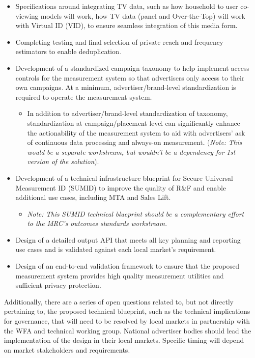 \documentclass[]{article}
\providecommand{\tightlist}{%
  \setlength{\itemsep}{0pt}\setlength{\parskip}{0pt}}
\begin{document}
\begin{itemize}
\tightlist
\item
  Specifications around integrating TV data, such as how household to user co-viewing models will work, how TV data (panel and Over-the-Top) will work with Virtual ID (VID), to ensure seamless integration of this media form.
\item
  Completing testing and final selection of private reach and frequency estimators to enable deduplication.
\item
  Development of a standardized campaign taxonomy to help implement access controls for the measurement system so that advertisers only access to their own campaigns. At a minimum, advertiser/brand-level standardization is required to operate the measurement system.

  \begin{itemize}
  \tightlist
  \item
    In addition to advertiser/brand-level standardization of taxonomy, standardization at campaign/placement level can significantly enhance the actionability of the measurement system to aid with advertisers' ask of continuous data processing and always-on measurement. (\emph{Note: This would be a separate workstream, but wouldn't be a dependency for 1st version of the solution}).
  \end{itemize}
\item
  Development of a technical infrastructure blueprint for Secure Universal Measurement ID (SUMID) to improve the quality of R\&F and enable additional use cases, including MTA and Sales Lift.

  \begin{itemize}
  \tightlist
  \item
    \emph{Note: This SUMID technical blueprint should be a complementary effort to the MRC's outcomes standards workstream.}
  \end{itemize}
\item
  Design of a detailed output API that meets all key planning and reporting use cases and is validated against each local market's requirement.
\item
  Design of an end-to-end validation framework to ensure that the proposed measurement system provides high quality measurement utilities and sufficient privacy protection.
\end{itemize}

Additionally, there are a series of open questions related to, but not directly pertaining to, the proposed technical blueprint, such as the technical implications for governance, that will need to be resolved by local markets in partnership with the WFA and technical working group. National advertiser bodies should lead the implementation of the design
in their local markets. Specific timing will depend on market stakeholders and requirements.
\end{document}

